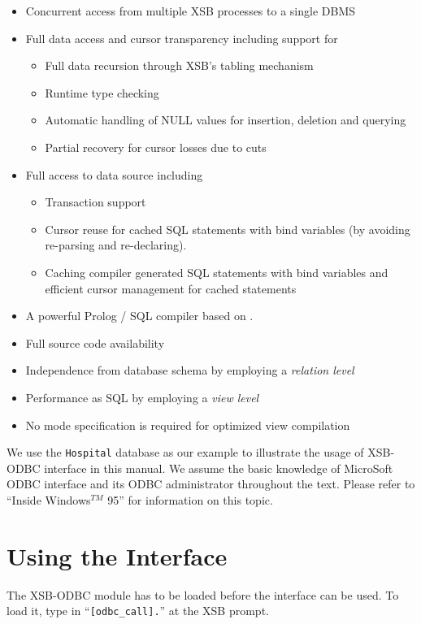 \begin{itemize} 
\item Concurrent access from multiple XSB processes to a single DBMS
\item Full data access and cursor transparency including support for
	\begin{itemize}
	\item Full data recursion through XSB's tabling mechanism
	\item Runtime type checking
	\item Automatic handling of NULL values for insertion, 
		deletion and querying
	\item Partial recovery for cursor losses due to cuts
	\end{itemize}
\item Full access to data source including
	\begin{itemize}
	\item Transaction support
	\item Cursor reuse for cached SQL statements 
		with bind variables (by avoiding re-parsing and re-declaring).
	\item Caching compiler generated SQL statements with bind variables 
		and efficient cursor management for cached statements
	\end{itemize}
\item A powerful Prolog / SQL compiler based on \cite{Drax92}.
\item Full source code availability
\item Independence from database schema by employing a {\it relation level}
\item Performance as SQL by employing a {\it view level} 
\item No mode specification is required for optimized view compilation
\end{itemize}

We use the {\tt Hospital} database as our example to illustrate 
the usage of XSB-ODBC interface in this manual. We assume the basic 
knowledge of MicroSoft ODBC interface and its ODBC administrator 
throughout the text.  Please refer to ``Inside Windows$^{TM}$ 95''
 for information on this topic.

\section{Using the Interface}

The XSB-ODBC module has to be loaded before the interface can be used.  
To load it, type in ``{\tt [odbc\_call].}'' at the XSB prompt.

